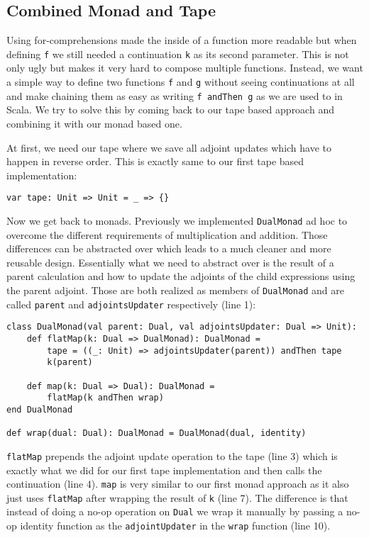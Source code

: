\subsection{Combined Monad and Tape} \label{sec:monadAndTape}

Using for-comprehensions made the inside of a function more readable but when defining \lstinline{f} we still needed a continuation \lstinline{k} as its second parameter. This is not only ugly but makes it very hard to compose multiple functions. Instead, we want a simple way to define two functions \lstinline{f} and \lstinline{g} without seeing continuations at all and make chaining them as easy as writing \lstinline{f andThen g} as we are used to in Scala. We try to solve this by coming back to our tape based approach and combining it with our monad based one.

At first, we need our tape where we save all adjoint updates which have to happen in reverse order. This is exactly same to our first tape based implementation:
\begin{lstlisting}
var tape: Unit => Unit = _ => {}
\end{lstlisting}

Now we get back to monads. Previously we implemented \lstinline{DualMonad} ad hoc to overcome the different requirements of multiplication and addition. Those differences can be abstracted over which leads to a much cleaner and more reusable design. Essentially what we need to abstract over is the result of a parent calculation and how to update the adjoints of the child expressions using the parent adjoint. Those are both realized as members of \lstinline{DualMonad} and are called \lstinline{parent} and \lstinline{adjointsUpdater} respectively (line 1):
\begin{lstlisting}[caption={Monad using tape}, label={lst:monadTape}]
class DualMonad(val parent: Dual, val adjointsUpdater: Dual => Unit):
    def flatMap(k: Dual => DualMonad): DualMonad =
        tape = ((_: Unit) => adjointsUpdater(parent)) andThen tape
        k(parent)

    def map(k: Dual => Dual): DualMonad =
        flatMap(k andThen wrap)
end DualMonad

def wrap(dual: Dual): DualMonad = DualMonad(dual, identity)
\end{lstlisting}
\lstinline{flatMap} prepends the adjoint update operation to the tape (line 3) which is exactly what we did for our first tape implementation and then calls the continuation (line 4). \lstinline{map} is very similar to our first monad approach as it also just uses \lstinline{flatMap} after wrapping the result of \lstinline{k} (line 7). The difference is that instead of doing a no-op operation on \lstinline{Dual} we wrap it manually by passing a no-op identity function as the \lstinline{adjointUpdater} in the \lstinline{wrap} function (line 10).

